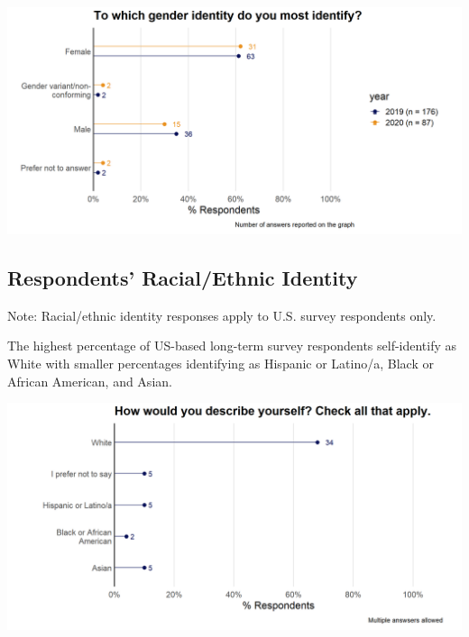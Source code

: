 \documentclass[
]{article}
\makeatletter
\def\maxwidth{\ifdim\Gin@nat@width>\linewidth\linewidth\else\Gin@nat@width\fi}
\makeatother
\begin{document}
\includegraphics[width=\maxwidth]{../figures/2020-12-longterm-demographics_gender-1}

\hypertarget{respondents-racialethnic-identity}{%
\subsection{Respondents' Racial/Ethnic
Identity}\label{respondents-racialethnic-identity}}

Note: Racial/ethnic identity responses apply to U.S. survey respondents
only.

The highest percentage of US-based long-term survey respondents
self-identify as White with smaller percentages identifying as Hispanic
or Latino/a, Black or African American, and Asian.

\includegraphics[width=\maxwidth]{../figures/2020-12-longterm-demographics_ethnicity-1}
\end{document}
